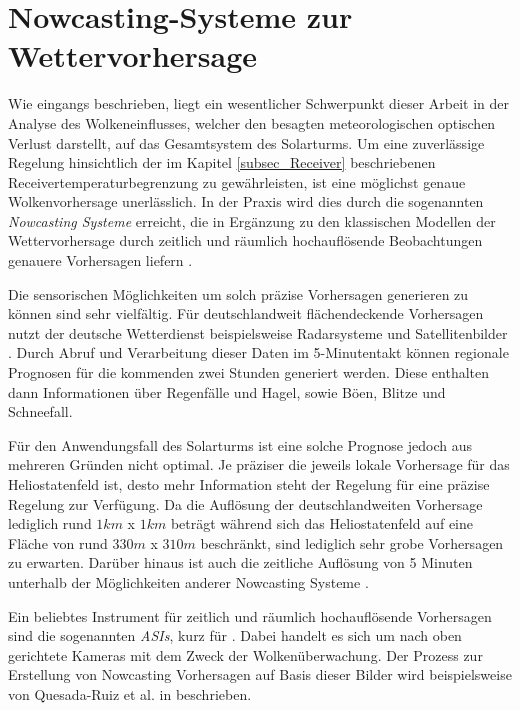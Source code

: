 \section{Nowcasting-Systeme zur Wettervorhersage} \label{sec_Nowcasting}
Wie eingangs beschrieben, liegt ein wesentlicher Schwerpunkt dieser Arbeit in der Analyse des Wolkeneinflusses, welcher den besagten meteorologischen optischen Verlust darstellt, auf das Gesamtsystem des Solarturms.
Um eine zuverlässige Regelung hinsichtlich der im Kapitel \ref{subsec_Receiver} beschriebenen Receivertemperaturbegrenzung zu gewährleisten, ist eine möglichst genaue Wolkenvorhersage unerlässlich.
In der Praxis wird dies durch die sogenannten \textit{Nowcasting Systeme} erreicht, die in Ergänzung zu den klassischen Modellen der Wettervorhersage durch zeitlich und räumlich hochauflösende Beobachtungen genauere Vorhersagen liefern \cite{DWD1}.

Die sensorischen Möglichkeiten um solch präzise Vorhersagen generieren zu können sind sehr vielfältig.
Für deutschlandweit flächendeckende Vorhersagen nutzt der deutsche Wetterdienst beispielsweise Radarsysteme und Satellitenbilder \cite{DWD1}.
Durch Abruf und Verarbeitung dieser Daten im 5-Minutentakt können regionale Prognosen für die kommenden zwei Stunden generiert werden.
Diese enthalten dann Informationen über Regenfälle und Hagel, sowie Böen, Blitze und Schneefall.

Für den Anwendungsfall des Solarturms ist eine solche Prognose jedoch aus mehreren Gründen nicht optimal.
Je präziser die jeweils lokale Vorhersage für das Heliostatenfeld ist, desto mehr Information steht der Regelung für eine präzise Regelung zur Verfügung.
Da die Auflösung der deutschlandweiten Vorhersage lediglich rund $1km$ x $1km$ beträgt \cite{DWD1}\cite{DWD2} während sich das Heliostatenfeld auf eine Fläche von rund $330m$ x $310m$ beschränkt, sind lediglich sehr grobe Vorhersagen zu erwarten.
Darüber hinaus ist auch die zeitliche Auflösung von 5 Minuten \cite{DWD2} unterhalb der Möglichkeiten anderer Nowcasting Systeme \cite{DLRNowcasting}\cite[S.272]{QuesadaRuiz}.

Ein beliebtes Instrument für zeitlich und räumlich hochauflösende Vorhersagen sind die sogenannten \textit{ASIs}, kurz für .
Dabei handelt es sich um nach oben gerichtete Kameras mit dem Zweck der Wolkenüberwachung.
Der Prozess zur Erstellung von Nowcasting Vorhersagen auf Basis dieser Bilder wird beispielsweise von Quesada-Ruiz et al. in \cite{QuesadaRuiz} beschrieben. \cite{Samu}

